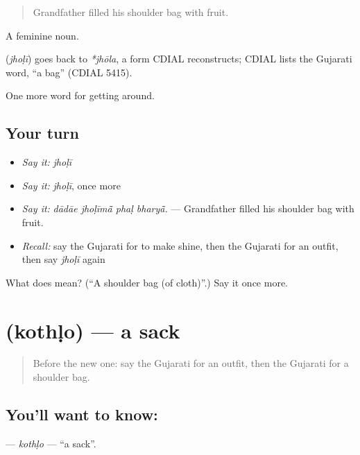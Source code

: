 \begin{quote}
Grandfather filled his shoulder bag with fruit.
\end{quote}

A feminine noun.

\begin{cousinweb}
\textbf{} (\emph{jhoḷī}) goes back to \emph{*jhōla}, a form CDIAL reconstructs; CDIAL lists the Gujarati word, \textquotedblleft{}a bag\textquotedblright{} (CDIAL 5415).
\end{cousinweb}

\begin{grammarlens}[title={What you've built}]
One more word for getting around.
\end{grammarlens}

\subsection*{Your turn}
\begin{itemize}
\raggedright
  \item \emph{Say it:} \emph{jhoḷī}
  \item \emph{Say it:} \emph{jhoḷī}, once more
  \item \emph{Say it:} \emph{dādāe jhoḷīmā̃ phaḷ bharyā̃.} — Grandfather filled his shoulder bag with fruit.
  \item \emph{Recall:} say the Gujarati for to make shine, then the Gujarati for an outfit, then say \emph{jhoḷī} again
\end{itemize}

\begin{tcolorbox}[breakable,colback=teal!4,colframe=teal!35!black,title={Before you move on}]
What does  mean? (\textquotedblleft{}A shoulder bag (of cloth)\textquotedblright{}.) Say it once more.
\end{tcolorbox}
\section[\texorpdfstring{\gu{કોથળો} (kothḷo)}{કોથળો (kothḷo)}]{ (kothḷo) — a sack}

\label{lesson:GU-C433-kothlo}



\begin{quote}
Before the new one: say the Gujarati for an outfit, then the Gujarati for a shoulder bag.
\end{quote}

\subsection*{You'll want to know: }
\textbf{} — \emph{kothḷo} — \textquotedblleft{}a sack\textquotedblright{}.

